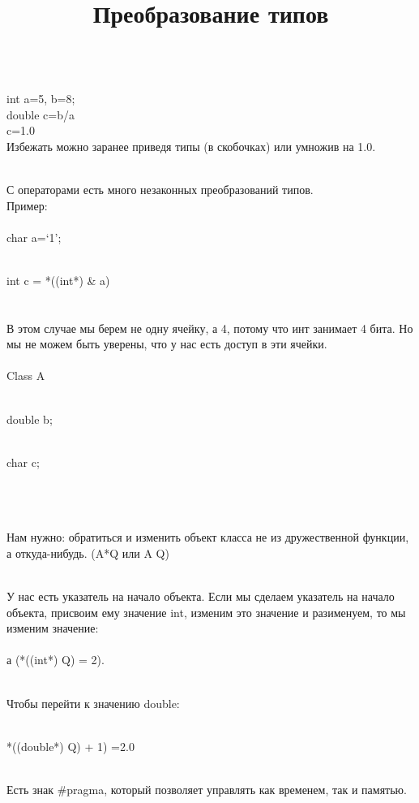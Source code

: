 \documentclass[a4paper,10pt]{article}
\title{Преобразование типов}
\begin{document}
\maketitle

\\int a=5, b=8;
\\double c=b/a
\\c=1.0
\\Избежать можно заранее приведя типы (в скобочках) или умножив на 1.0.

\\С операторами есть много незаконных преобразований типов. 
\\

Пример:
\\
\hline
\\char a=‘1’;

\\int c = *((int*) & a)
\\
\hline
\\

\\В этом случае мы берем не одну ячейку, а 4, потому что инт занимает 4 бита. Но мы не можем быть уверены, что у нас есть доступ в эти ячейки. 
\\

\hline
\\Class A {

\\double b;

\\char c;}
\\
\hline
\\

\\Нам нужно: обратиться и изменить объект класса не из дружественной функции, а откуда-нибудь. (A*Q или A Q)

\\У нас есть указатель на начало объекта. Если мы сделаем указатель на начало объекта, присвоим ему значение int, изменим это значение и разименуем, то мы изменим значение:
\\

\\а (*((int*) Q) = 2).

\\Чтобы перейти к значению double:

\\*((double*) Q) + 1) =2.0

\\Есть знак #pragma, который позволяет управлять как временем, так и памятью.
\end{document}
